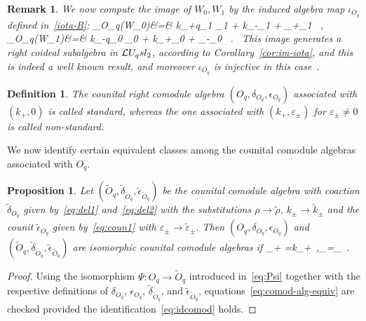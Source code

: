 \documentclass[11pt]{amsart}
\numberwithin{equation}{section}
\newtheorem{prop}[thm]{Proposition}
\newtheorem{defn}[thm]{Definition}
\newtheorem{rem}[thm]{Remark}
\numberwithin{equation}{section}
\begin{document}
\begin{rem}\label{rem:iotadef}
 We now compute the image of $W_0,W_1$ by the induced algebra map $\iota_{O_q}$  defined in~\eqref{iota-B}:
\beqa
\iota_{O_q}(W_0)&=&  k_+q\te_1 \tk_1 + k_-\tf_1 +  \varepsilon_+\tk_1 \in \Loop \ ,\label{eq:iot1}\\
	\iota_{O_q}(W_1)&=&  k_-q\te_0 \tk_0 + k_+\tf_0 + \varepsilon_-\tk_0 \in \Loop\ .\label{eq:iot2}\
\eeqa
This image generates a right coideal subalgebra in $\mathcal{L} U_q sl_2$, according to Corollary~\ref{cor:im-iota}, and this is indeed a well known result, and moreover $\iota_{O_q}$ is injective in this case~\cite[Thm.\,7.4\,\&\,Ex.\,7.6]{Ko12}.
\end{rem}

\begin{defn}\label{def:stnst} The counital right comodule algebra $(O_q,\delta_{O_q},\epsilon_{O_q})$ associated with $(k_+,0)$ is called standard, whereas the one associated with $(k_+,\varepsilon_\pm)$ for $\varepsilon_\pm\neq 0$ is called non-standard.
\end{defn}

We now identify certain equivalent classes among the counital comodule algebras associated with $O_q$.

\begin{prop}\label{prop:isocomod} 
Let 
$(\tilde{O}_q,\tilde{\delta}_{\tilde{O}_q},\tilde{\epsilon}_{\tilde{O}_q})$ be the counital comodule algebra with coaction $\tilde{\delta}_{O_q}$ given by~\eqref{eq:del1} and~\eqref{eq:del2}
 with the substitutions $\rho \rightarrow \tilde{\rho}$, $k_\pm \rightarrow \tilde{k}_\pm$ and the counit $\tilde{\epsilon}_{O_q}$  given by~\eqref{eq:coun1} with $\varepsilon_\pm \rightarrow \tilde{\varepsilon}_\pm$. Then
$(O_q,\delta_{O_q},\epsilon_{O_q})$ and  $(\tilde{O}_q,\tilde{\delta}_{\tilde{O}_q},\tilde{\epsilon}_{\tilde{O}_q})$ are isomorphic counital comodule  algebras if 
\beqa
{}_+ =\sqrt{\frac{\tilde{\rho}}{\rho}}k_+\ ,\quad \tilde{\varepsilon}_\pm =\sqrt{\frac{\tilde{\rho}}{\rho}}\varepsilon_\pm\ . \label{eq:idcomod}
\eeqa
\end{prop}
\begin{proof}
Using the isomorphism $\Psi\colon O_q \rightarrow \tilde{O}_q$ introduced in~\eqref{eq:Psi} together with the respective definitions of $\delta_{O_q}$, $\epsilon_{O_q}$, $\tilde{\delta}_{\tilde{O}_q}$, and $\tilde{\epsilon}_{\tilde{O}_q}$, equations~\eqref{eq:comod-alg-equiv} are checked provided the identification~\eqref{eq:idcomod} holds.
\end{proof}
\end{document}

